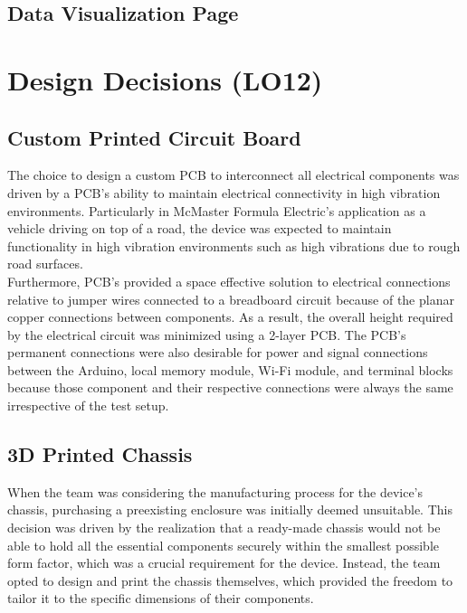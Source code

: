 \documentclass[12pt]{article}
\begin{document}
\subsection{Data Visualization Page}

\section{Design Decisions (LO12)}


\subsection{Custom Printed Circuit Board}
The choice to design a custom PCB to interconnect all electrical components was driven by a PCB's ability to maintain  electrical connectivity in high vibration environments. Particularly in McMaster Formula Electric's application as a vehicle driving on top of a road, the device was expected to maintain functionality in high vibration environments such as high vibrations due to rough road surfaces. \\

Furthermore, PCB's provided a space effective solution to electrical connections relative to jumper wires connected to a breadboard circuit because of the planar copper connections between components. As a result, the overall height required by the electrical circuit was minimized using a 2-layer PCB. The PCB's permanent connections were also desirable for power and signal connections between the Arduino, local memory module, Wi-Fi module, and terminal blocks because those component and their respective connections were always the same irrespective of the test setup. \\

\subsection{3D Printed Chassis}
When the team was considering the manufacturing process for the device's chassis, purchasing a preexisting enclosure was initially deemed unsuitable. This decision was driven by the realization that a ready-made chassis would not be able to hold all the essential components securely within the smallest possible form factor, which was a crucial requirement for the device. Instead, the team opted to design and print the chassis themselves, which provided the freedom to tailor it to the specific dimensions of their components.\\
\end{document}

